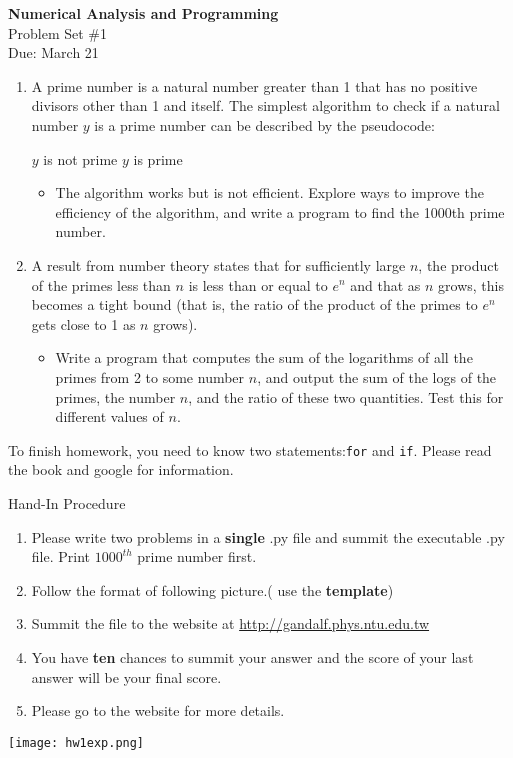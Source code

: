 \documentclass[12pt]{article}
\begin{document}
\begin{center}
\Large
\textbf{Numerical Analysis and Programming}\\
\large
Problem Set \#1\\
Due: March 21
\end{center}
\begin{enumerate}
\item A prime number is a natural number greater than 1 that has no positive divisors other than 1 and itself. The simplest algorithm to check if a natural number $y$ is a prime number can be described by the pseudocode:
\begin{algorithmic}[1]

\State \Return $y$ is not prime
\EndIf
\EndFor
\State \Return $y$ is prime
\end{algorithmic}

\begin{itemize}
\item The algorithm works but is not efficient. Explore ways to improve the efficiency of the algorithm, and  write a program to find the  1000th prime number.
\end{itemize}
\item  A result from number theory  states that for sufficiently large $n$, the product of
the primes less than $n$ is less than or equal to $e^n$ and that as $n$ grows, this becomes a tight
bound (that is, the ratio of the product of the primes to $e^n$ gets close to 1 as $n$ grows).
\begin{itemize}
\item Write a program that computes the sum of the logarithms of all the primes from 2 to some
number $n$, and output the sum of the logs of the primes, the number $n$, and the ratio of these
two quantities. Test this for different values of $n$.
\end{itemize}
\end{enumerate}
To finish homework, you need to know two statements:\texttt{for} and \texttt{if}. Please read the book and  google for information.


Hand-In Procedure

\begin{enumerate}
\item Please write two problems in a \textbf{single} .py file and summit the executable .py file. Print $1000^{th}$ prime number first.
\item Follow the format of following picture.( use the \textbf{template})
\item Summit the file to the website at \url{http://gandalf.phys.ntu.edu.tw}
\item You have \textbf{ten} chances to summit your answer and the score of your last answer will
  be your final score.
\item Please go to the website for more details.
\end{enumerate}
\texttt{[image: hw1exp.png]}
\end{document}
